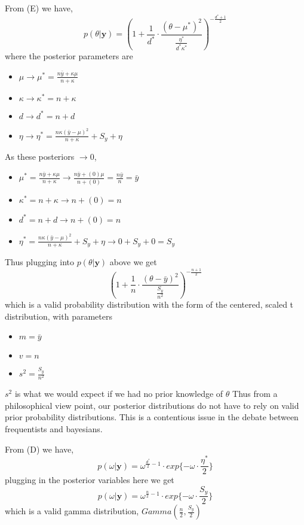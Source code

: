 \documentclass{homework}
\begin{document}
\begin{enumerate}[label=(\Alph*)]
From (E) we have,
$$p(\theta | \textbf{y} ) = ( 1 + \frac{1}{d^*} \cdot \frac{(\theta - \mu^*)^2}{\frac{\eta^*}{d^*\kappa^*}})^{-\frac{d^*+1}{2}} $$
where the posterior parameters are 
\begin{itemize}
\item $\mu \rightarrow \mu^* =  \frac{n\bar{y} + \kappa\mu}{n + \kappa}$
\item $\kappa \rightarrow \kappa^* = n + \kappa$ 
\item $d \rightarrow d^* = n + d$  
\item $\eta \rightarrow \eta^* = \frac{ n\kappa( \bar{y} - \mu)^2}{n + \kappa} +  S_y + \eta$
\end{itemize}
As these posteriors $\rightarrow 0$,  
\begin{itemize}
\item $ \mu^* =  \frac{n\bar{y} + \kappa\mu}{n + \kappa} \rightarrow \frac{n\bar{y} + (0)\mu}{n + (0)} = \frac{n\bar{y}}{n} = \bar{y}$
\item $\kappa^* = n + \kappa \rightarrow n + (0) = n$ 
\item $d^* = n + d \rightarrow n + (0) = n$  
\item $\eta^* = \frac{ n\kappa( \bar{y} - \mu)^2}{n + \kappa} +  S_y + \eta \rightarrow 0 + S_y + 0 = S_y$
\end{itemize}
Thus plugging into $p(\theta | \textbf{y} )$ above we get
$$ ( 1 + \frac{1}{n} \cdot \frac{(\theta - \bar{y})^2}{\frac{S_y}{n^2}})^{-\frac{n+1}{2}} $$
which is a valid probability distribution with the form of the centered, scaled t distribution, with parameters
\begin{itemize}
\item $ m = \bar{y}$
\item $ v = n$ 
\item $s^2 = \frac{S_y}{n^2}$
\end{itemize}
$s^2$ is what we would expect if we had no prior knowledge of $\theta$
Thus from a philosophical view point, 
our posterior distributions do not have to rely on valid prior probability distributions.  
This is a contentious issue in the debate between frequentists and bayesians.

From (D) we have,
$$p(\omega | \textbf{y}) = \omega^{\frac{d^*}{2} - 1} \cdot exp\{-\omega \cdot \frac{\eta^*}{2}\}  $$
plugging in the posterior variables here we get
$$ p(\omega | \textbf{y}) = \omega^{\frac{n}{2} - 1} \cdot exp\{-\omega \cdot \frac{S_y}{2}\}  $$
which is a valid gamma distribution,  $Gamma(\frac{n}{2}, \frac{S_y}{2})$ \\


\end{enumerate}
\end{document}
